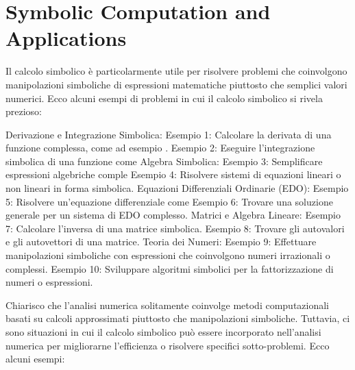 
\chapter{Symbolic Computation and Applications}
\label{chap2:symbolic_computation}

Il calcolo simbolico è particolarmente utile per risolvere problemi che coinvolgono manipolazioni simboliche di espressioni matematiche piuttosto che semplici valori numerici. Ecco alcuni esempi di problemi in cui il calcolo simbolico si rivela prezioso:

Derivazione e Integrazione Simbolica:
Esempio 1: Calcolare la derivata di una funzione complessa, come ad esempio .
Esempio 2: Eseguire l'integrazione simbolica di una funzione come
Algebra Simbolica:
Esempio 3: Semplificare espressioni algebriche comple
Esempio 4: Risolvere sistemi di equazioni lineari o non lineari in forma simbolica.
Equazioni Differenziali Ordinarie (EDO):
Esempio 5: Risolvere un'equazione differenziale come
Esempio 6: Trovare una soluzione generale per un sistema di EDO complesso.
Matrici e Algebra Lineare:
Esempio 7: Calcolare l'inversa di una matrice simbolica.
Esempio 8: Trovare gli autovalori e gli autovettori di una matrice.
Teoria dei Numeri:
Esempio 9: Effettuare manipolazioni simboliche con espressioni che coinvolgono numeri irrazionali o complessi.
Esempio 10: Sviluppare algoritmi simbolici per la fattorizzazione di numeri o espressioni.


Chiarisco che l'analisi numerica solitamente coinvolge metodi computazionali basati su calcoli approssimati piuttosto che manipolazioni simboliche. Tuttavia, ci sono situazioni in cui il calcolo simbolico può essere incorporato nell'analisi numerica per migliorarne l'efficienza o risolvere specifici sotto-problemi. Ecco alcuni esempi:

